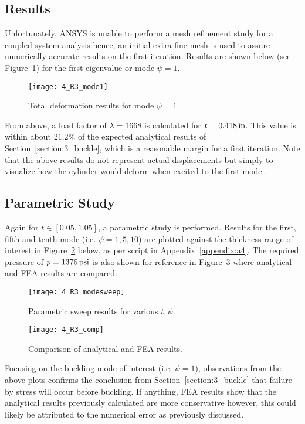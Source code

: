 \subsection{Results}

Unfortunately, ANSYS is unable to perform a mesh refinement study for a coupled system analysis hence, an initial extra fine mesh is used to assure numerically accurate results on the first iteration. Results are shown below (see Figure~\ref{fig:4_R3_mode1}) for the first eigenvalue or mode $\psi = 1$.
\begin{figure}[H]
	\centering
	\texttt{[image: 4\_R3\_mode1]}
	\caption{Total deformation results for mode $\psi = 1$.}
	\label{fig:4_R3_mode1}
\end{figure}

From above, a load factor of $\lambda = 1668$ is calculated for $t= 0.418\,\mathrm{in}$. This value is within about $21.2\%$ of the expected analytical results of Section~\ref{section:3_buckle}, which is a reasonable margin for a first iteration. Note that the above results do not represent actual displacements but simply to visualize how the cylinder would deform when excited to the first mode \cite{ANSYS}.

\subsection{Parametric Study}

Again for $t\in [0.05, 1.05]$, a parametric study is performed. Results for the first, fifth and tenth mode (i.e. $\psi = 1, 5, 10$) are plotted against the thickness range of interest in Figure~\ref{fig:4_R3_modesweep} below, as per \cite{PYTHON} script in Appendix~\ref{appendix:a4}. The required pressure of $p =1376\,\mathrm{psi}$ is also shown for reference in Figure~\ref{fig:4_R3_comp} where analytical and FEA results are compared.

\begin{figure}[H]
	\centering
	\texttt{[image: 4\_R3\_modesweep]}
	\caption{Parametric sweep results for various $t, \psi$.}
	\label{fig:4_R3_modesweep}
\end{figure}

\begin{figure}[H]
	\centering
	\texttt{[image: 4\_R3\_comp]}
	\caption{Comparison of analytical and FEA results.}
	\label{fig:4_R3_comp}
\end{figure}

Focusing on the buckling mode of interest (i.e. $\psi=1$), observations from the above plots confirms the conclusion from Section~\ref{section:3_buckle} that failure by stress will occur before buckling. If anything, FEA results show that the analytical results previously calculated are more conservative however, this could likely be attributed to the numerical error as previously discussed.\\

